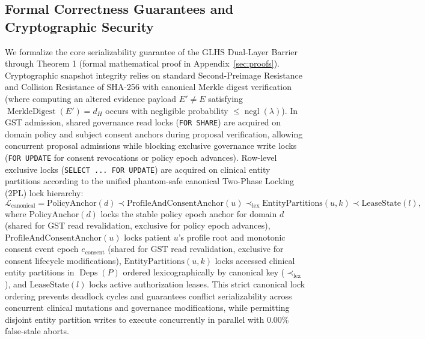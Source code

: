 \documentclass[11pt]{article}
\begin{document}
\subsection{Formal Correctness Guarantees and Cryptographic Security}
We formalize the core serializability guarantee of the GLHS Dual-Layer Barrier through Theorem 1 (formal mathematical proof in Appendix~\ref{sec:proofs}). Cryptographic snapshot integrity relies on standard Second-Preimage Resistance and Collision Resistance of SHA-256 with canonical Merkle digest verification (where computing an altered evidence payload $E' \ne E$ satisfying $\operatorname{MerkleDigest}(E') = d_H$ occurs with negligible probability $\le \operatorname{negl}(\lambda)$). In GST admission, shared governance read locks (\texttt{FOR SHARE}) are acquired on domain policy and subject consent anchors during proposal verification, allowing concurrent proposal admissions while blocking exclusive governance write locks (\texttt{FOR UPDATE} for consent revocations or policy epoch advances). Row-level exclusive locks (\texttt{SELECT ... FOR UPDATE}) are acquired on clinical entity partitions according to the unified phantom-safe canonical Two-Phase Locking (2PL) lock hierarchy:
\begin{equation}
\mathcal{L}_{\text{canonical}} = \text{PolicyAnchor}(d) \prec \text{ProfileAndConsentAnchor}(u) \prec_{\text{lex}} \text{EntityPartitions}(u, k) \prec \text{LeaseState}(l),
\label{eq:canonical_lock_hierarchy}
\end{equation}
where $\text{PolicyAnchor}(d)$ locks the stable policy epoch anchor for domain $d$ (shared for GST read revalidation, exclusive for policy epoch advances), $\text{ProfileAndConsentAnchor}(u)$ locks patient $u$'s profile root and monotonic consent event epoch $e_{\text{consent}}$ (shared for GST read revalidation, exclusive for consent lifecycle modifications), $\text{EntityPartitions}(u, k)$ locks accessed clinical entity partitions in $\operatorname{Deps}(P)$ ordered lexicographically by canonical key ($\prec_{\text{lex}}$), and $\text{LeaseState}(l)$ locks active authorization leases. This strict canonical lock ordering prevents deadlock cycles and guarantees conflict serializability across concurrent clinical mutations and governance modifications, while permitting disjoint entity partition writes to execute concurrently in parallel with $0.00\%$ false-stale aborts.
\end{document}
